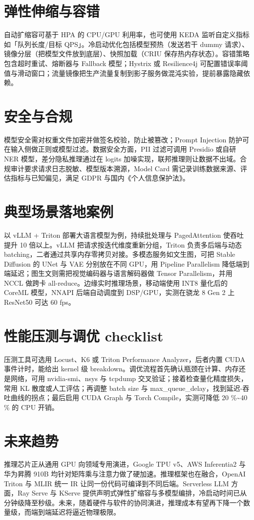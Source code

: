 \chapter{弹性伸缩与容错}
自动扩缩容可基于 HPA 的 CPU/GPU 利用率，也可使用 KEDA 监听自定义指标如「队列长度/目标 QPS」。冷启动优化包括模型预热（发送若干 dummy 请求）、镜像分层（把模型文件放到底层）、快照加载（CRIU 保存热内存状态）。容错策略包含超时重试、熔断器与 Fallback 模型；Hystrix 或 Resilience4j 可配置错误率阈值与滑动窗口；流量镜像把生产流量复制到影子服务做混沌实验，提前暴露隐藏依赖。\par
\chapter{安全与合规}
模型安全需对权重文件加密并做签名校验，防止被篡改；Prompt Injection 防护可在输入侧做正则或模型过滤。数据安全方面，PII 过滤可调用 Presidio 或自研 NER 模型，差分隐私推理通过在 logits 加噪实现，联邦推理则让数据不出域。合规审计要求请求日志脱敏、模型版本溯源，Model Card 需记录训练数据来源、评估指标与已知偏见，满足 GDPR 与国内《个人信息保护法》。\par
\chapter{典型场景落地案例}
以 vLLM + Triton 部署大语言模型为例，持续批处理与 PagedAttention 使吞吐提升 10 倍以上。vLLM 把请求按迭代维度重新分组，Triton 负责多后端与动态 batching，二者通过共享内存零拷贝对接。多模态服务如文生图，可把 Stable Diffusion 的 UNet 与 VAE 分别放在不同 GPU，用 Pipeline Parallelism 降低端到端延迟；图生文则需把视觉编码器与语言解码器做 Tensor Parallelism，并用 NCCL 做跨卡 all-reduce。边缘实时推理场景，移动端使用 INT8 量化后的 CoreML 模型，NNAPI 后端自动调度到 DSP/GPU，实测在骁龙 8 Gen 2 上 ResNet50 可达 60 fps。\par
\chapter{性能压测与调优 checklist}
压测工具可选用 Locust、K6 或 Triton Performance Analyzer，后者内置 CUDA 事件计时，能给出 kernel 级 breakdown。调优流程首先确认瓶颈在计算、内存还是网络，可用 nvidia-smi、nsys 与 tcpdump 交叉验证；接着检查量化精度损失，常用 KL 散度或人工评估；再调整 batch size 与 max\_{}queue\_{}delay，找到延迟-吞吐曲线的拐点；最后启用 CUDA Graph 与 Torch Compile，实测可降低 20 \%{}\~{}40 \%{} 的 CPU 开销。\par
\chapter{未来趋势}
推理芯片正从通用 GPU 向领域专用演进，Google TPU v5、AWS Inferentia2 与华为昇腾 910B 均针对矩阵乘与注意力做了硬加速。推理框架也在融合，OpenAI Triton 与 MLIR 统一 IR 让同一份代码可编译到不同后端。Serverless LLM 方面，Ray Serve 与 KServe 提供声明式弹性扩缩容与多模型编排，冷启动时间已从分钟级降至秒级。未来，随着硬件与软件的协同演进，推理成本有望再下降一个数量级，而端到端延迟将逼近物理极限。\par
